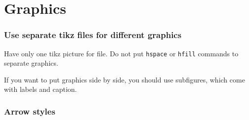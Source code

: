 
\section{Graphics}

\subsubsection*{Use separate tikz files for different graphics}

Have only one tikz picture for file.
Do not put \texttt{hspace} or \texttt{hfill} commands to separate graphics.

If you want to put graphics side by side, you should use subfigures, which come with labels and caption.

\subsubsection*{Arrow styles}

